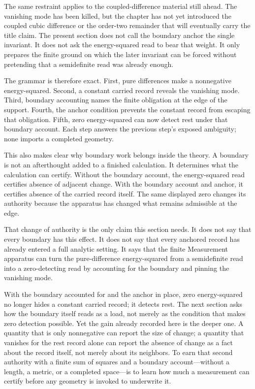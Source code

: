 The same restraint applies to the coupled-difference material still ahead. The
vanishing mode has been killed, but the chapter has not yet introduced the
coupled cubic difference or the order-two remainder that will eventually carry
the title claim. The present section does not call the boundary anchor the
single invariant. It does not ask the energy-squared read to bear that weight.
It only prepares the finite ground on which the later invariant can be forced
without pretending that a semidefinite read was already enough.

The grammar is therefore exact. First, pure differences make a nonnegative
energy-squared. Second, a constant carried record reveals the vanishing mode.
Third, boundary accounting names the finite obligation at the edge of the
support. Fourth, the anchor condition prevents the constant record from
escaping that obligation. Fifth, zero energy-squared can now detect rest under
that boundary account. Each step answers the previous step's exposed
ambiguity; none imports a completed geometry.

This also makes clear why boundary work belongs
inside the theory. A boundary is not an afterthought added to a finished
calculation. It determines what the calculation can certify. Without the
boundary account, the energy-squared read certifies absence of adjacent
change. With the boundary account and anchor, it certifies absence of the
carried record itself. The same displayed zero changes its authority because
the apparatus has changed what remains admissible at the edge.

That change of authority is the only claim this section needs. It does not say
that every boundary has this effect. It does not say that every anchored
record has already entered a full analytic setting. It says that the finite
Measurement apparatus can turn the pure-difference energy-squared from a
semidefinite read into a zero-detecting read by accounting for the boundary and
pinning the vanishing mode.

With the boundary accounted for and the anchor in place, zero energy-squared
no longer hides a constant carried record; it detects rest. The next section
asks how the boundary itself reads as a load, not merely as the condition that
makes zero detection possible. Yet the gain already recorded here is the deeper
one. A quantity that is only nonnegative can report the size of change; a
quantity that vanishes for the rest record alone can report the absence of
change as a fact about the record itself, not merely about its neighbors. To
earn that second authority with a finite sum of squares and a boundary
account---without a length, a metric, or a completed space---is to learn how
much a measurement can certify before any geometry is invoked to underwrite it.

